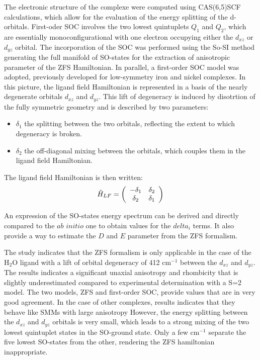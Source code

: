 \documentclass[12pt]{report}
\numberwithin{equation}{section}
\begin{document}
The electronic structure of the complexe were computed using CAS(6,5)SCF calculations, which allow for the evaluation of the energy splitting of the d-orbitals.
First-oder SOC involves the two lowest quintuplets $Q_1$ and $Q_2$, which are essentially monoconfigurational with one electron occupying either the $d_{xz}$ or $d_{yz}$ orbital.
The incorporation of the SOC was performed using the So-SI method generating the full manifold of SO-states for the extraction of anisotropic parameter of the ZFS Hamiltonian.
In parallel, a first-order SOC model was adopted, previously developed for low-symmetry iron and nickel complexes.
In this picture, the ligand field Hamiltonian is represented in a basis of the nearly degenerate orbitals $d_{xz}$ and $d_{yz}$.
This lift of degeneracy is induced by disotrtion of the fully symmetric geometry and is described by two parameters:

\begin{itemize}
    \item $\delta_1$ the splitting between the two orbitals, reflecting the extent to which degeneracy is broken.
    \item $\delta_2$ the off-diagonal mixing between the orbitals, which couples them in the ligand field Hamiltonian.
\end{itemize}

The ligand field Hamiltonian is then written:
\[ \hat{H}_{LF}= \left( \begin{array}{c c}
    -\delta_1 & \delta_2 \\
    \delta_2& \delta_1
    \end{array} \right)
\]

An expression of the SO-states energy spectrum can be derived and directly compared to the $ab$ $initio$ one to obtain values for the $delta_i$ terms.
It also provide a way to estimate the $D$ and $E$ parameter from the ZFS formalism.


The study indicates that the ZFS formalism is only applicable in the case of the H$_2$O ligand with a lift of orbital degeneracy of 412 cm$^{-1}$ between the $d_{xz}$ and $d_{yz}$.
The results indicates a significant unaxial anisotropy and rhombicity that is slightly underestimated compared to experimental determination with a S=2 model.
The two models, ZFS and first-order SOC, provide values that are in very good agreement.
In the case of other complexes, results indicates that they behave like SMMs with large anisotropy
However, the energy splitting between the $d_{xz}$ and $d_{yz}$ orbitals is very small, which leads to a strong mixing of the two lowest quintuplet states in the SO-ground state.
Only a few cm$^{-1}$ separate the five lowest SO-states from the other, rendering the ZFS hamiltonian inappropriate.
\end{document}
